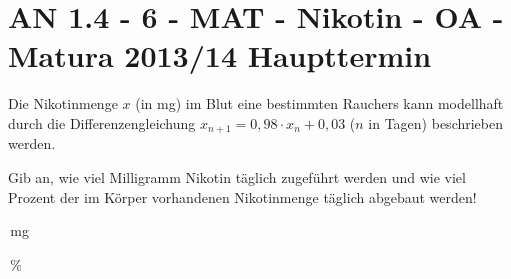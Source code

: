 \section{AN 1.4 - 6 - MAT - Nikotin - OA - Matura 2013/14 Haupttermin}

\begin{beispiel}[AN 1.4]{1} %
				Die Nikotinmenge $x$ (in mg) im Blut eine bestimmten Rauchers kann modellhaft durch die Differenzengleichung $x_{n+1}=0,98\cdot x_n+0,03$ ($n$ in Tagen) beschrieben werden.
				
				Gib an, wie viel Milligramm Nikotin täglich zugeführt werden und wie viel Prozent der im Körper vorhandenen Nikotinmenge täglich abgebaut werden!
				
				\,mg
				
				\,\%
\end{beispiel}